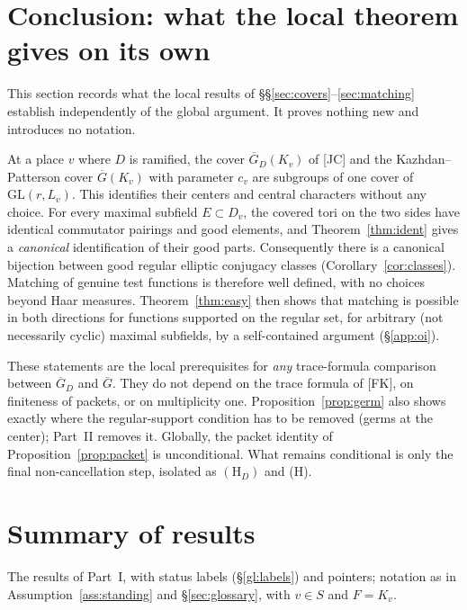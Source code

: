 \documentclass[12pt]{article}
\newcommand{\ov}[1]{\overline{#1}}
\newcommand{\GL}{\mathrm{GL}}
\newcommand{\Gb}{\ov{G}}
\newcommand{\GDb}{\ov{G}_D}
\theoremstyle{plain}
\theoremstyle{definition}
\begin{document}
\section{Conclusion: what the local theorem gives on its own}\label{sec:conclusion}
This section records what the local results of \S\S\ref{sec:covers}--\ref{sec:matching} establish independently of the global argument. It proves nothing new and introduces no notation.

At a place $v$ where $D$ is ramified, the cover $\GDb(K_v)$ of [JC] and the Kazhdan--Patterson cover $\Gb(K_v)$ with parameter $c_v$ are subgroups of one cover of $\GL(r,L_v)$. This identifies their centers and central characters without any choice. For every maximal subfield $E\subset D_v$, the covered tori on the two sides have identical commutator pairings and good elements, and Theorem~\ref{thm:ident} gives a \emph{canonical} identification of their good parts. Consequently there is a canonical bijection between good regular elliptic conjugacy classes (Corollary~\ref{cor:classes}). Matching of genuine test functions is therefore well defined, with no choices beyond Haar measures. Theorem~\ref{thm:easy} then shows that matching is possible in both directions for functions supported on the regular set, for arbitrary (not necessarily cyclic) maximal subfields, by a self-contained argument (\S\ref{app:oi}).

These statements are the local prerequisites for \emph{any} trace-formula comparison between $\GDb$ and $\Gb$. They do not depend on the trace formula of [FK], on finiteness of packets, or on multiplicity one. Proposition~\ref{prop:germ} also shows exactly where the regular-support condition has to be removed (germs at the center); Part~II removes it. Globally, the packet identity of Proposition~\ref{prop:packet} is unconditional. What remains conditional is only the final non-cancellation step, isolated as $(\mathrm H_D)$ and (H).

\section{Summary of results}\label{sec:summary}
The results of Part~I, with status labels (\S\ref{gl:labels}) and pointers; notation as in Assumption~\ref{ass:standing} and \S\ref{sec:glossary}, with $v\in S$ and $F=K_v$.
\end{document}
